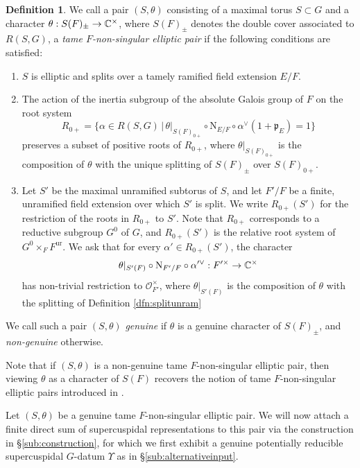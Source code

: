 \documentclass{article}
\def\mf#1{\mathfrak{#1}}
\def\cO{\mathcal{O}}
\newcommand{\bC}{\mathbb{C}}
\theoremstyle{definition}
\newtheorem{dfn}[thm]{Definition}
\numberwithin{equation}{subsection}
\renewcommand{\-}{\hyp{}}
\newcommand{\rN}{\mathrm{N}}
\begin{document}
\begin{dfn} \label{dfn:nonsingularpairs}
	We call a pair $(S, \theta)$ consisting of a maximal torus $S \subset G$ and a character $\theta: S(F)_{\pm} \ra \bC^\times$, where $S(F)_{\pm}$ denotes the double cover associated to $R(S,G)$, a \emph{tame $F$-non-singular elliptic pair} if the following conditions are satisfied:
	\begin{enumerate}
		\item $S$ is elliptic and splits over a tamely ramified field extension $E/F$.
		\item \label{cond:G0} The action of the inertia subgroup of the absolute Galois group of $F$ on the root system
		\[ R_{0+}= \{ \alpha \in R(S,G) \, | \, \theta|_{S(F)_{0+}}\circ \rN_{E/F}\circ \alpha^\vee(1+\mf{p}_E)=1 \} \]
		preserves a subset of positive roots of $R_{0+}$, where $\theta|_{S(F)_{0+}}$ is the composition of $\theta$ with the unique splitting of $S(F)_\pm$ over $S(F)_{0+}$.
		\item Let $S'$ be the maximal unramified subtorus of $S$, and let $F'/F$ be a finite, unramified field extension over which  $S'$ is split. We write $R_{0+}(S')$ for the restriction of the roots in $R_{0+}$ to $S'$. Note that $R_{0+}$ corresponds to a reductive subgroup $G^0$ of $G$, and $R_{0+}(S')$ is the relative root system of $G^0 \times_FF^{\mathrm{ur}}$. We ask that for every $\alpha' \in R_{0+}(S')$, the character 
		\[\theta|_{S'(F)} \circ \rN_{F'/F} \circ \alpha'^\vee :F'^\times \ra \bC^\times \]
		has non-trivial restriction to $\cO_{F'}^\times$, where $\theta|_{S'(F)}$ is the composition of $\theta$ with the splitting of Definition \ref{dfn:splitunram}
	\end{enumerate} 
	We call such a pair $(S,\theta)$ \emph{genuine} if $\theta$ is a genuine character of $S(F)_{\pm}$, and \emph{non-genuine} otherwise.
\end{dfn}
Note that if $(S,\theta)$ is a non-genuine tame $F$-non-singular elliptic pair, then viewing $\theta$ as a character of $S(F)$ recovers the notion of tame $F$-non-singular elliptic pairs introduced in \cite[Definition~3.4.1]{KalSLP}.

Let $(S,\theta)$ be a genuine tame $F$-non-singular elliptic pair. We will now attach a finite direct sum of supercuspidal representations to this pair via the construction in \S\ref{sub:construction}, for which we first exhibit a genuine potentially reducible supercuspidal $G$-datum $\Upsilon$ as in \S\ref{sub:alternativeinput}. 
\end{document}
